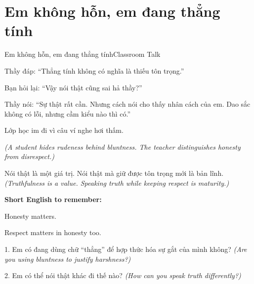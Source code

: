 \section{Em không hỗn, em đang thẳng tính}
\begin{truyen}{Em không hỗn, em đang thẳng tính}{Classroom Talk}

Thầy đáp: ``Thẳng tính không có nghĩa là thiếu tôn trọng.''

Bạn hỏi lại: ``Vậy nói thật cũng sai hả thầy?''

Thầy nói: ``Sự thật rất cần. Nhưng cách nói cho thấy nhân cách của em. Dao sắc không có lỗi, nhưng cầm kiểu nào thì có.''

Lớp học im đi vì câu ví nghe hơi thấm.

\textit{(A student hides rudeness behind bluntness. The teacher distinguishes honesty from disrespect.)}
\end{truyen}

\begin{baihoc}
Nói thật là một giá trị. Nói thật mà giữ được tôn trọng mới là bản lĩnh.
\textit{(Truthfulness is a value. Speaking truth while keeping respect is maturity.)}
\end{baihoc}

\begin{ghinhoanh}
\textbf{Short English to remember:}

Honesty matters.

Respect matters in honesty too.
\end{ghinhoanh}

\begin{tuhocnhanh}
1. Em có đang dùng chữ ``thẳng'' để hợp thức hóa sự gắt của mình không? \textit{(Are you using bluntness to justify harshness?)}

2. Em có thể nói thật khác đi thế nào? \textit{(How can you speak truth differently?)}
\end{tuhocnhanh}
\ngancach